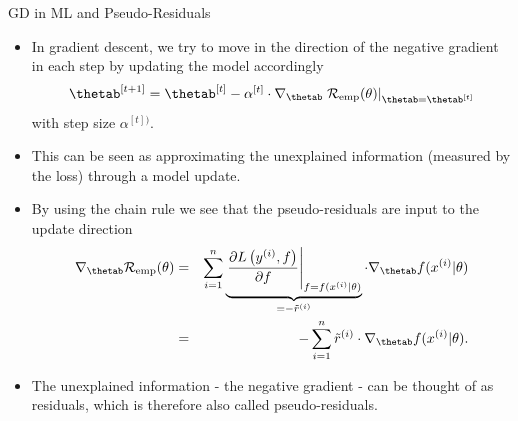 \begin{vbframe}{GD in ML and Pseudo-Residuals}

\begin{itemize}
	\item In gradient descent, we try to move in the direction of the negative gradient in each step by updating the model accordingly 
	$$
	 \thetab^{[t + 1]} = \thetab^{[t]} - \alpha^{[t]} \cdot \nabla_{\thetab} \left.\risket\right|_{\thetab = \thetab^{[t]}}	
	$$
	with step size $\alpha^{[t])}$. 
	\item This can be seen as approximating the unexplained information (measured by the loss) through a model update. 
	\framebreak 
	\item By using the chain rule we see that the pseudo-residuals are input to the update direction
	\begin{eqnarray*}
	\nabla_{\thetab} \risket &=&\sumin \underbrace{\left.\frac{\partial L\left(\yi, f\right)}{\partial f} \right|_{f = \fxit} }_{= - \tilde r^{(i)}}
	\cdot \nabla_{\thetab} \fxit \\ 
	&=& - \sumin \tilde r^{(i)} \cdot \nabla_{\thetab} \fxit.
	\end{eqnarray*}
	\item The unexplained information - the negative gradient - can be thought of as residuals, which is therefore also called pseudo-residuals. 
\end{itemize}	

\end{vbframe}


\endlecture

